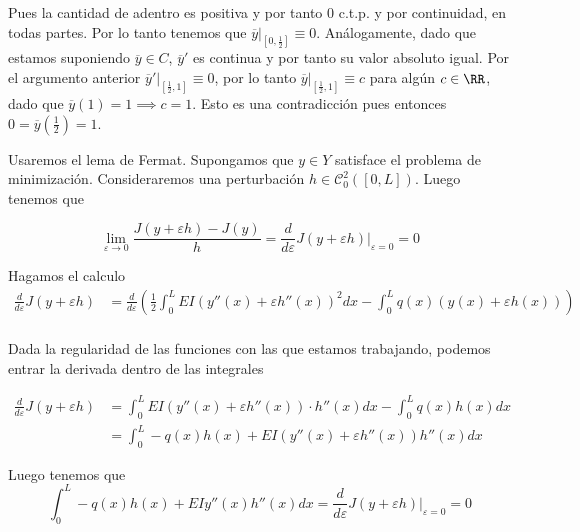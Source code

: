 \documentclass[a4paper,oneside,10.5pt]{USMArt}
\begin{document}
\begin{sol}
\begin{enumerate}
    Pues la cantidad de adentro es positiva y por tanto $0$ c.t.p. y por continuidad, en todas partes.
    Por lo tanto tenemos que $\overline{y}|_{[0, \frac12]} \equiv 0$.
    Análogamente, dado que estamos suponiendo $\overline{y} \in C$, $\overline{y}'$ es continua y por
    tanto su valor absoluto igual. Por el argumento anterior $\overline{y}'|_{[\frac12, 1]} \equiv 0$,
    por lo tanto $\overline{y}|_{[\frac12, 1]} \equiv c$ para algún $c \in \RR$,
    dado que $\overline{y}(1) = 1 \implies c = 1$.
    Esto es una contradicción pues entonces $0 = \overline{y}(\frac12) = 1$.
  \end{enumerate}
\end{sol}

\begin{sol}
  Usaremos el lema de Fermat. Supongamos que $y \in Y$ satisface el problema de minimización.
  Consideraremos una perturbación $h \in \mathcal{C}_{0}^{2}([0, L])$. Luego tenemos que

  \begin{equation*}
    \lim_{\varepsilon \to 0} \frac{J(y + \varepsilon h) - J(y)}{h} = \frac{d}{d \varepsilon} J(y + \varepsilon h)\big|_{\varepsilon = 0} = 0
  \end{equation*}

  Hagamos el calculo
  \begin{align*}
    \frac{d}{d \varepsilon} J(y + \varepsilon h) &= \frac{d}{d \varepsilon}(\frac12 \int_{0}^{L} EI(y''(x) + \varepsilon h''(x))^{2} dx - \int_{0}^{L} q(x)(y(x) + \varepsilon h(x)))\\
  \end{align*}

  Dada la regularidad de las funciones con las que estamos trabajando,
  podemos entrar la derivada dentro de las integrales

  \begin{align*}
    \frac{d}{d \varepsilon} J(y + \varepsilon h) &= \int_{0}^{L} EI(y''(x) + \varepsilon h''(x)) \cdot h''(x) dx - \int_{0}^{L} q(x)h(x) dx\\
                                                 &= \int_{0}^{L} -q(x)h(x) + EI(y''(x) + \varepsilon h''(x))h''(x) dx
  \end{align*}

  Luego tenemos que
  \begin{equation*}
    \int_{0}^{L} -q(x)h(x) + EIy''(x)h''(x) dx = \frac{d}{d \varepsilon} J(y + \varepsilon h)|_{\varepsilon = 0} = 0
  \end{equation*}


\end{sol}
\end{document}
